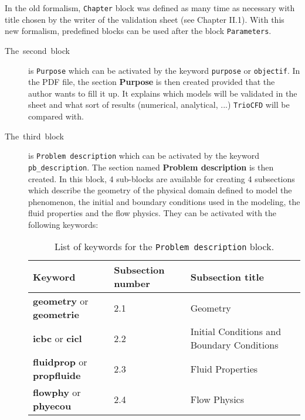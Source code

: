 In the old formalism, \texttt{Chapter} block was defined as many time as necessary with title chosen by the writer of the validation sheet (see Chapter II.1).
With this new formalism, predefined blocks can be used after the block \texttt{Parameters}.\smallskip\newline
\begin{description}
\item [{The~second~block}] is \texttt{Purpose} which can be activated
by the keyword \texttt{purpose} or \texttt{objectif}. In the PDF file,
the section \textbf{Purpose} is then created provided that the author
wants to fill it up. It explains which models will be validated in
the sheet and what sort of results (numerical, analytical, ...) \texttt{TrioCFD}
will be compared with.\smallskip\newline

\item [{The~third~block}] is \texttt{Problem description} which can be
activated by the keyword \texttt{pb\_description}. The section named
\textbf{Problem description} is then created. In this block, 4 sub-blocks
are available for creating 4 subsections which describe the geometry
of the physical domain defined to model the phenomenon, the initial
and boundary conditions used in the modeling, the fluid properties
and the flow physics. They can be activated with the following keywords:\smallskip\newline
\begin{table}[H]
\begin{centering}
\begin{tabular*}{16cm}{m{4.5cm} m{3cm} m{7.5cm}}
\hline 
\textbf{Keyword} & \textbf{Subsection number} & \textbf{Subsection title}\tabularnewline
\hline 
\textbf{geometry} or \textbf{geometrie} & 2.1 & Geometry\tabularnewline
\textbf{icbc} or \textbf{cicl} & 2.2 & Initial Conditions and Boundary Conditions\tabularnewline
\textbf{fluidprop} or \textbf{propfluide} & 2.3 & Fluid Properties\tabularnewline
\textbf{flowphy} or \textbf{phyecou} & 2.4 & Flow Physics\tabularnewline
\hline 
\end{tabular*}
\par\end{centering}
\caption{\label{tab:List-of-keyword-pbdes}List of keywords for the \texttt{Problem description} block.}
\end{table}


\end{description}

